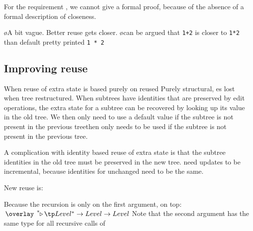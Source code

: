 
For the requirement , we cannot give a formal proof, because of the absence of a formal description of closeness. 


\bl
\o A bit vague. Better reuse gets closer.
\o can be argued that \verb|1+2| is closer to \verb|1*2| than default pretty printed \verb|1 * 2| 
\el
\fromHere


\subsection{Improving reuse} \label{subsect:reuseid}

When reuse of extra state is based purely on reused Purely structural, es lost when tree restructured. 
When subtrees have identities that are preserved by edit operations, the extra state for a subtree can be recovered by looking up its value in the old tree. We then only need to use a default value if the subtree is not present in the previous treethen only needs to be used if the subtree is not present in the previous tree. 

A complication with identity based reuse of extra state is that the subtree identities in the old tree must be preserved in the new tree. 
need updates to be incremental, because identities for unchanged need to be the same.

New reuse is:
 

Because the recursion is only on the first argument, on top: $\reuzestar \tp Level^* \to Level \to Level$ 
Note that the second argument has the same type for all recursive calls of 

